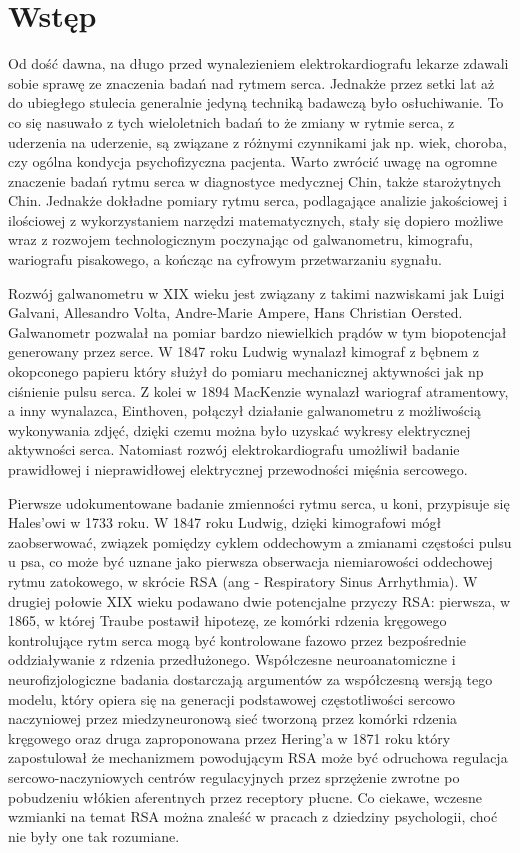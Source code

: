\chapter*{Wstęp}

Od dość dawna, na długo przed wynalezieniem elektrokardiografu lekarze zdawali sobie
sprawę ze znaczenia badań nad rytmem serca. Jednakże przez setki lat aż do ubiegłego
stulecia generalnie jedyną techniką badawczą było osłuchiwanie. To co się nasuwało
z tych wieloletnich badań to że zmiany w rytmie serca, z uderzenia na uderzenie,
są związane z różnymi czynnikami jak np. wiek, choroba, czy ogólna kondycja
psychofizyczna pacjenta. Warto zwrócić uwagę na ogromne znaczenie badań rytmu serca w
diagnostyce medycznej Chin, także starożytnych Chin. Jednakże dokładne pomiary rytmu
serca, podlagające analizie jakościowej i ilościowej z wykorzystaniem narzędzi
matematycznych, stały się dopiero możliwe wraz z rozwojem technologicznym poczynając
od galwanometru, kimografu, wariografu pisakowego, a kończąc na cyfrowym przetwarzaniu
sygnału.

Rozwój galwanometru w XIX wieku jest związany z takimi nazwiskami jak Luigi Galvani,
Allesandro Volta, Andre-Marie Ampere, Hans Christian Oersted. Galwanometr pozwalał na
pomiar bardzo niewielkich prądów w tym biopotencjał generowany przez serce.
W 1847 roku Ludwig wynalazł kimograf z bębnem z okopconego papieru który służył
do pomiaru mechanicznej aktywności jak np ciśnienie pulsu serca. Z kolei w 1894
MacKenzie wynalazł wariograf atramentowy, a inny wynalazca, Einthoven,
połączył działanie galwanometru z możliwością wykonywania zdjęć, dzięki czemu
można było uzyskać wykresy elektrycznej aktywności serca. Natomiast rozwój
elektrokardiografu umożliwił badanie prawidłowej i nieprawidłowej elektrycznej
przewodności mięśnia sercowego.

Pierwsze udokumentowane badanie zmienności rytmu serca, u koni, przypisuje się Hales'owi
w 1733 roku. W 1847 roku Ludwig, dzięki kimografowi mógł zaobserwować, związek
pomiędzy cyklem oddechowym a zmianami częstości pulsu u psa,
co może być uznane jako pierwsza obserwacja niemiarowości oddechowej rytmu zatokowego,
w skrócie RSA (ang - Respiratory Sinus Arrhythmia). W drugiej połowie XIX wieku
podawano dwie potencjalne przyczy RSA: pierwsza, w 1865, w której Traube postawił
hipotezę, ze komórki rdzenia kręgowego kontrolujące rytm serca mogą być kontrolowane
fazowo przez bezpośrednie oddziaływanie z rdzenia przedłużonego. Współczesne
neuroanatomiczne i neurofizjologiczne badania dostarczają argumentów za współczesną
wersją tego modelu, który opiera się na generacji podstawowej częstotliwości sercowo
naczyniowej przez miedzyneuronową sieć tworzoną przez komórki rdzenia kręgowego
oraz druga zaproponowana przez Hering'a w 1871 roku który zapostulował że mechanizmem
powodującym RSA może być odruchowa regulacja sercowo-naczyniowych centrów
regulacyjnych przez sprzężenie zwrotne po pobudzeniu włókien aferentnych przez
receptory płucne. Co ciekawe, wczesne wzmianki na temat RSA można znaleść w pracach z
dziedziny psychologii, choć nie były one tak rozumiane.


